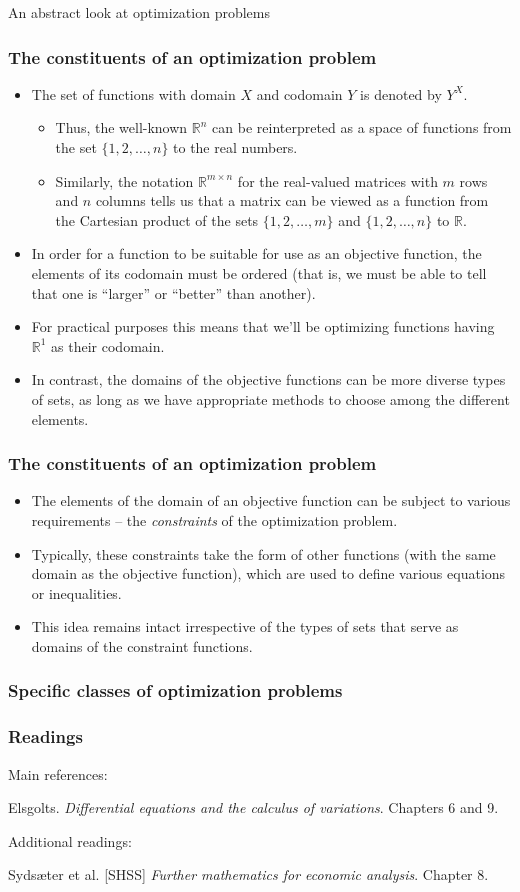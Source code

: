 \documentclass[10pt]{beamer}
\theoremstyle{definition}
\begin{document}
\begin{section}{An abstract look at optimization problems}
\begin{frame}[fragile]
\frametitle{The constituents of an optimization problem}
\begin{itemize} \itemsep1em
\item The set of functions with domain $ X $ and codomain $ Y $ is denoted by $ Y^X $. 
		\begin{itemize}
		\item Thus, the well-known $ \mathbb{R}^n $ can be reinterpreted as a space of functions from the set $ \{1,2,\ldots,n\} $ to the real numbers.
		\item Similarly, the notation $ \mathbb{R}^{m\times n} $ for the real-valued matrices with $ m $ rows and $ n $ columns tells us that a matrix can be viewed as a function from the Cartesian product of the sets $ \{1,2,\ldots,m\} $ and $ \{1,2,\ldots,n\} $ to $ \mathbb{R} $.
		\end{itemize} 
\item In order for a function to be suitable for use as an objective function, the elements of its codomain must be ordered (that is, we must be able to tell that one is ``larger'' or ``better'' than another).
\item For practical purposes this means that we'll be optimizing functions having $ \mathbb{R}^1 $ as their codomain. 
\item In contrast, the domains of the objective functions can be more diverse types of sets, as long as we have appropriate methods to choose among the different elements.
\end{itemize}
\end{frame}

\begin{frame}[fragile]
\frametitle{The constituents of an optimization problem}
\begin{itemize} \itemsep1em
\item The elements of the domain of an objective function can be subject to various requirements -- the \emph{constraints} of the optimization problem.
\item Typically, these constraints take the form of other functions (with the same domain as the objective function), which are used to define various equations or inequalities.
\item This idea remains intact irrespective of the types of sets that serve as domains of the constraint functions.
\end{itemize}
\end{frame}

\begin{frame}[fragile]
\frametitle{Specific classes of optimization problems}

\end{frame}

\end{section}
\begin{frame}[fragile]
\frametitle{Readings}
Main references:

Elsgolts. \emph{Differential equations and the calculus of variations}. Chapters 6 and 9.\bigskip

Additional readings:

Syds\ae{}ter et al. [SHSS] \emph{Further mathematics for economic analysis}. Chapter 8.

\end{frame}
\end{document}
